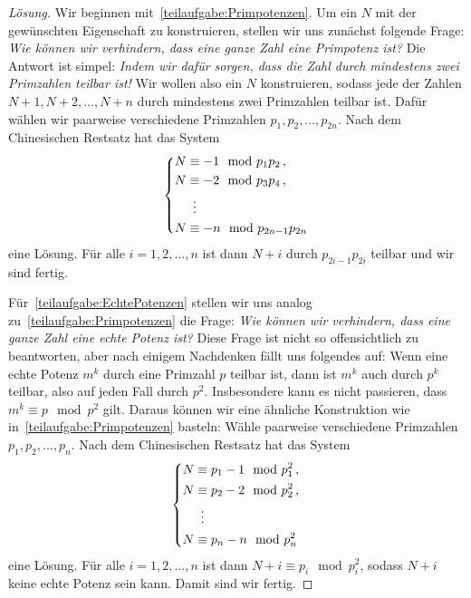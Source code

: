 \begin{proof}[Lösung]
	Wir beginnen mit~\ref{teilaufgabe:Primpotenzen}. Um ein $N$ mit der gewünschten Eigenschaft zu konstruieren, stellen wir uns zunächst folgende Frage: \emph{Wie können wir verhindern, dass eine ganze Zahl eine Primpotenz ist?} Die Antwort ist simpel: \emph{Indem wir dafür sorgen, dass die Zahl durch mindestens zwei Primzahlen teilbar ist!} Wir wollen also ein $N$ konstruieren, sodass jede der Zahlen $N+1,N+2,\dotsc,N+n$ durch mindestens zwei Primzahlen teilbar ist. Dafür wählen wir paarweise verschiedene Primzahlen $p_1,p_2,\dotsc,p_{2n}$. Nach dem Chinesischen Restsatz hat das System
	\begin{equation*}
		\left\{\begin{aligned}
			N&\equiv -1\mod p_1p_2\,,\\
			N&\equiv -2\mod p_3p_4\,,\\
			&\mathrel{\tikz[inner sep=0,outer sep=0]{\node at (0,-0.5ex) {$\phantom{=}$};\node at (0,0) {$\vdots$};}}\\
			N&\equiv -n\mod p_{2n-1}p_{2n}
		\end{aligned}\right.
	\end{equation*}
	eine Lösung. Für alle $i=1,2,\dotsc,n$ ist dann $N+i$ durch $p_{2i-1}p_{2i}$ teilbar und wir sind fertig.
	
	Für~\ref{teilaufgabe:EchtePotenzen} stellen wir uns analog zu~\ref{teilaufgabe:Primpotenzen} die Frage: \emph{Wie können wir verhindern, dass eine ganze Zahl eine echte Potenz ist?} Diese Frage ist nicht so offensichtlich zu beantworten, aber nach einigem Nachdenken fällt uns folgendes auf: Wenn eine echte Potenz $m^k$ durch eine Primzahl $p$ teilbar ist, dann ist $m^k$ auch durch $p^k$ teilbar, also auf jeden Fall durch $p^2$. Insbesondere kann es nicht passieren, dass $m^k\equiv p\mod p^2$ gilt. Daraus können wir eine ähnliche Konstruktion wie in~\ref{teilaufgabe:Primpotenzen} basteln: Wähle paarweise verschiedene Primzahlen $p_1,p_2,\dotsc,p_n$. Nach dem Chinesischen Restsatz hat das System
	\begin{equation*}
		\left\{\begin{aligned}
			N&\equiv p_1-1\mod p_1^2\,,\\
			N&\equiv p_2-2\mod p_2^2\,,\\
			&\mathrel{\tikz[inner sep=0,outer sep=0]{\node at (0,-0.5ex) {$\phantom{=}$};\node at (0,0) {$\vdots$};}}\\
			N&\equiv p_n-n\mod p_n^2
		\end{aligned}\right.
	\end{equation*}
	eine Lösung. Für alle $i=1,2,\dotsc,n$ ist dann $N+i\equiv p_i\mod p_i^2$, sodass $N+i$ keine echte Potenz sein kann. Damit sind wir fertig.
\end{proof}

